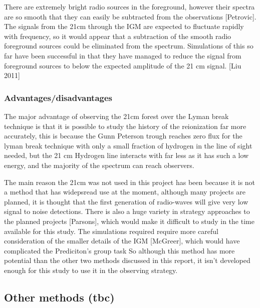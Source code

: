 There are extremely bright radio sources in the foreground, however their spectra are so smooth that they can easily be subtracted from the observations [Petrovic]. The signals from the 21cm through the IGM are expected to fluctuate rapidly with frequency, so it would appear that a subtraction of the smooth radio foreground sources could be eliminated from the spectrum. Simulations of this so far have been successful in that they have managed to reduce the signal from foreground sources to below the expected amplitude of the 21 cm signal. [Liu 2011]


         \subsubsection{Advantages/disadvantages} %
	\label{subsub:Advantages_disadvantages_21cm}
The major advantage of observing the 21cm forest over the Lyman break technique is that it is possible to study the history of the reionization far more accurately, this is because the Gunn Peterson trough reaches zero flux for the lyman break technique with only a small fraction of hydrogen in the line of sight needed, but the 21 cm Hydrogen line interacts with far less as it has such a low energy, and the majority of the spectrum can reach observers. 

The main reason the 21cm was not used in this project has been because it is not a method that has widepsread use at the moment, although many projects are planned, it is thought that the first generation of radio-waves will give very low signal to noise detections. There is also a huge variety in strategy approaches to the planned projects [Parsons], which would make it difficult to study in the time available for this study. The simulations required require more careful consideration of the smaller details of the IGM [McGreer], which would have complicated the Prediciton's group task  So although this method has more potential than the other two methods discussed in this report, it isn't developed enough for this study to use it in the observing strategy. 

    \subsection{Other methods (tbc)} %
    \label{sub:Other_Methods_Reionization}
